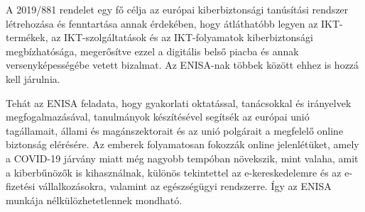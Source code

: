 A 2019/881 rendelet egy fő célja az európai kiberbiztonsági tanúsítási rendszer létrehozása és fenntartása annak érdekében, hogy átláthatóbb legyen az IKT-termékek, az IKT-szolgáltatások és az IKT-folyamatok kiberbiztonsági megbízhatósága, megerősítve ezzel a digitális belső piacba és annak versenyképességébe vetett bizalmat. Az ENISA-nak többek között ehhez is hozzá kell járulnia.

Tehát az ENISA feladata, hogy gyakorlati oktatással, tanácsokkal és irányelvek megfogalmazásával, tanulmányok készítésével segítsék az európai unió tagállamait, állami és magánszektorait és az unió polgárait a megfelelő online biztonság elérésére. Az emberek folyamatosan fokozzák online jelenlétüket, amely a COVID-19 járvány miatt még nagyobb tempóban növekszik, mint valaha, amit a kiberbűnözők is kihasználnak, különös tekintettel az e-kereskedelemre és az e-fizetési vállalkozásokra, valamint az egészségügyi rendszerre. Így az ENISA munkája nélkülözhetetlennek mondható. \cite{ENISA-honlap, ENISA-osszefoglalo}